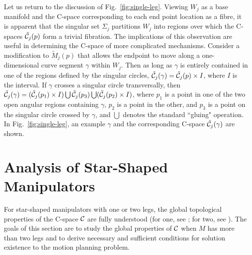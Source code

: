 \documentclass[twocolumn]{IEEEtran}
\begin{document}
Let us return to the discussion of Fig.~\ref{fig:single-leg}.
Viewing $W_j$ as a base manifold and the C-space corresponding to
each end point location as a fibre, it is apparent that the singular
set $\Sigma_j$ partitions $W_j$ into regions over which the C-spaces
$\tilde {\cal C}_j(p)$ form a trivial fibration. The implications of
this observation are useful in determining the C-space of more
complicated mechanisms.  Consider a modification to $\tilde M_j(p)$
that allows the endpoint to move along a one-dimensional curve
segment $\gamma$ within $W_j$.  Then as long as $\gamma$ is entirely
contained in one of the regions defined by the singular circles,
$\tilde {\cal C}_j(\gamma) = \tilde {\cal C}_j(p) \times I$, where
$I$ is the interval.  If $\gamma$ crosses a singular circle
transversally, then $\tilde {\cal C}_j(\gamma) = (\tilde {\cal
C}_j(p_1) \times I) \bigcup \tilde {\cal C}_j(p_3) \bigcup (\tilde
{\cal C}_j(p_2) \times I)$, where $p_1$ is a point in one of the two
open angular regions containing $\gamma$, $p_2$ is a point in the
other, and $p_3$ is a point on the singular circle crossed by
$\gamma$, and $\bigcup$ denotes the standard ``gluing" operation. In
Fig.~\ref{fig:single-leg}, an example $\gamma$ and the corresponding
C-space $\tilde {\cal C}_j(\gamma)$ are shown.

\section{Analysis of Star-Shaped Manipulators}
\label{section-2} For star-shaped manipulators with one or two legs,
the global topological properties of the C-space ${\cal C}$ are
fully understood (for one, see \cite{Lat92}; for two, see
\cite{TM02,MT04}). The goals of this section are to study the global
properties of ${\cal C}$ when $M$ has more than two legs and to
derive necessary and sufficient conditions for solution existence to
the motion planning problem.
\end{document}

